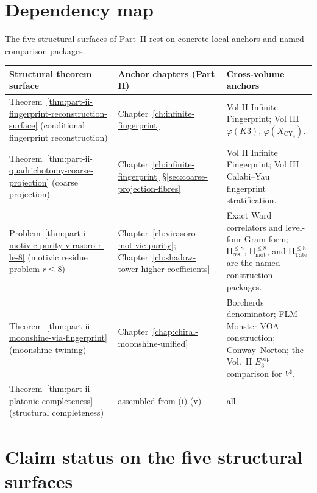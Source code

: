 \section{Dependency map}
\label{sec:part-ii-dependency-map}

The five structural surfaces of Part~II rest on concrete local
anchors and named comparison packages.

\begin{center}
\begin{tabular}{p{3.5cm}|p{6cm}|p{5cm}}
\hline
\textbf{Structural theorem surface} & \textbf{Anchor chapters (Part II)}
 & \textbf{Cross-volume anchors} \\
\hline
Theorem~\ref{thm:part-ii-fingerprint-reconstruction-surface}
(conditional fingerprint reconstruction)
 & Chapter~\ref{ch:infinite-fingerprint}
 & Vol II
 Infinite Fingerprint; Vol III
 $\varphi(K3)$, $\varphi(X_{\mathrm{CY}_3})$. \\
\hline
Theorem~\ref{thm:part-ii-quadrichotomy-coarse-projection}
(coarse projection)
 & Chapter~\ref{ch:infinite-fingerprint}
 \S\ref{sec:coarse-projection-fibres}
 & Vol II Infinite Fingerprint; Vol III Calabi--Yau fingerprint
 stratification. \\
\hline
Problem~\ref{thm:part-ii-motivic-purity-virasoro-r-le-8}
(motivic residue problem $r \le 8$)
 & Chapter~\ref{ch:virasoro-motivic-purity};
 Chapter~\ref{ch:shadow-tower-higher-coefficients}
 & Exact Ward correlators and level-four Gram form;
 $\mathsf H_{\mathrm{res}}^{\le8}$,
 $\mathsf H_{\mathrm{mot}}^{\le8}$, and
 $\mathsf H_{\mathrm{Tate}}^{\le8}$ are the named construction
 packages. \\
\hline
Theorem~\ref{thm:part-ii-moonshine-via-fingerprint}
(moonshine twining)
 & Chapter~\ref{chap:chiral-moonshine-unified}
 & Borcherds denominator;
 FLM Monster VOA construction; Conway--Norton; the Vol.~II
 \(E_3^{\mathrm{top}}\) comparison for \(V^\natural\). \\
\hline
Theorem~\ref{thm:part-ii-platonic-completeness}
(structural completeness)
 & assembled from (i)-(v)
 & all. \\
\hline
\end{tabular}
\end{center}

\section{Claim status on the five structural surfaces}
\label{sec:part-ii-hz-iv-closures}


